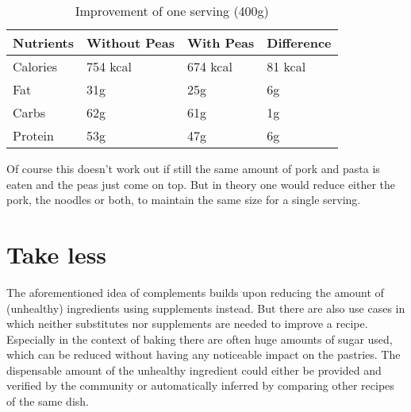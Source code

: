 \begin{table}[H]
	\hspace{-5pt}
	\begin{scriptsize}
		\begin{tabularx}{\textwidth + 5pt}{| @{\hspace{3pt}} M | @{\hspace{3pt}} M | @{\hspace{3pt}} M | @{\hspace{3pt}} M |}
		\hline
		\textbf{Nutrients} & \textbf{Without Peas} & \textbf{With Peas} & \textbf{Difference}\\
		\hline
		Calories & 754 kcal & 674 kcal  & 81 kcal\\
		\hline
		Fat & 31g & 25g  & 6g\\
		\hline
		Carbs & 62g & 61g  & 1g\\
		\hline
		Protein & 53g & 47g  & 6g\\
		\hline
	\end{tabularx}
	\end{scriptsize}
	\caption{Improvement of one serving (400g)}
	\vspace{1em}
\end{table}

Of course this doesn’t work out if still the same amount of pork and pasta is eaten and the peas just come on top. But in theory one would reduce either the pork, the noodles or both, to maintain the same size for a single serving.

\section*{Take less}
The aforementioned idea of complements builds upon reducing the amount of (unhealthy) ingredients using supplements instead. But there are also use cases in which neither substitutes nor supplements are needed to improve a recipe. Especially in the context of baking there are often huge amounts of sugar used, which can be reduced without having any noticeable impact on the pastries. The dispensable amount of the unhealthy ingredient could either be provided and verified by the community or automatically inferred by comparing other recipes of the same dish.

